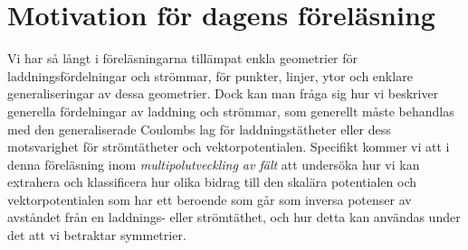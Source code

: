 {{{{{\section{Motivation f{\"o}r dagens f{\"o}rel{\"a}sning}
Vi har s{\aa} l{\aa}ngt i f{\"o}rel{\"a}sningarna till{\"a}mpat enkla
geometrier f{\"o}r laddningsf{\"o}rdelningar och str{\"o}m\-mar, f{\"o}r
punkter, linjer, ytor och enklare generaliseringar av dessa geometrier.
Dock kan man fr{\aa}ga sig hur vi beskriver generella f{\"o}rdelningar av
laddning och str{\"o}mmar, som generellt m{\aa}ste behandlas med den
generaliserade Coulombs lag f{\"o}r laddningst{\"a}theter eller dess
motsvarighet f{\"o}r str{\"o}mt{\"a}theter och vektorpotentialen. Specifikt
kommer vi att i denna f{\"o}rel{\"a}sning inom {\it multipolutveckling av
f{\"a}lt} att unders{\"o}ka hur vi kan extrahera och klassificera hur olika
bidrag till den skal{\"a}ra potentialen och vektorpotentialen som har ett
beroende som g{\aa}r som inversa potenser av avst{\aa}ndet fr{\aa}n en
laddnings- eller str{\"o}mt{\"a}thet, och hur detta kan anv{\"a}ndas under
det att vi betraktar symmetrier.

}}}}}
